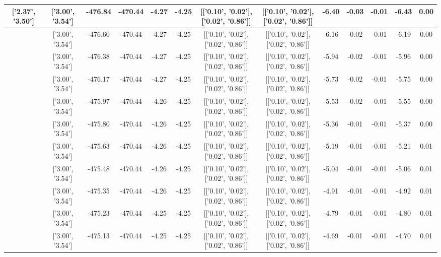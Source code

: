 \begin{table}[htbp]
\begin{adjustbox}{angle=90}
\begin{tabular}{|c|c|c|c|c|c|c|c|c|c|c|c|c|}
 ['2.37', '3.50'] & ['3.00', '3.54'] & -476.84 & -470.44 & -4.27 & -4.25 & [['0.10', '0.02'], ['0.02', '0.86']] & [['0.10', '0.02'], ['0.02', '0.86']] & -6.40 & -0.03 & -0.01 & -6.43 & 0.00\\ \hline
 ['2.41', '3.50'] & ['3.00', '3.54'] & -476.60 & -470.44 & -4.27 & -4.25 & [['0.10', '0.02'], ['0.02', '0.86']] & [['0.10', '0.02'], ['0.02', '0.86']] & -6.16 & -0.02 & -0.01 & -6.19 & 0.00\\ \hline
 ['2.45', '3.50'] & ['3.00', '3.54'] & -476.38 & -470.44 & -4.27 & -4.25 & [['0.10', '0.02'], ['0.02', '0.86']] & [['0.10', '0.02'], ['0.02', '0.86']] & -5.94 & -0.02 & -0.01 & -5.96 & 0.00\\ \hline
 ['2.48', '3.51'] & ['3.00', '3.54'] & -476.17 & -470.44 & -4.27 & -4.25 & [['0.10', '0.02'], ['0.02', '0.86']] & [['0.10', '0.02'], ['0.02', '0.86']] & -5.73 & -0.02 & -0.01 & -5.75 & 0.00\\ \hline
 ['2.52', '3.51'] & ['3.00', '3.54'] & -475.97 & -470.44 & -4.26 & -4.25 & [['0.10', '0.02'], ['0.02', '0.86']] & [['0.10', '0.02'], ['0.02', '0.86']] & -5.53 & -0.02 & -0.01 & -5.55 & 0.00\\ \hline
 ['2.56', '3.51'] & ['3.00', '3.54'] & -475.80 & -470.44 & -4.26 & -4.25 & [['0.10', '0.02'], ['0.02', '0.86']] & [['0.10', '0.02'], ['0.02', '0.86']] & -5.36 & -0.01 & -0.01 & -5.37 & 0.00\\ \hline
 ['2.60', '3.51'] & ['3.00', '3.54'] & -475.63 & -470.44 & -4.26 & -4.25 & [['0.10', '0.02'], ['0.02', '0.86']] & [['0.10', '0.02'], ['0.02', '0.86']] & -5.19 & -0.01 & -0.01 & -5.21 & 0.01\\ \hline
 ['2.64', '3.52'] & ['3.00', '3.54'] & -475.48 & -470.44 & -4.26 & -4.25 & [['0.10', '0.02'], ['0.02', '0.86']] & [['0.10', '0.02'], ['0.02', '0.86']] & -5.04 & -0.01 & -0.01 & -5.06 & 0.01\\ \hline
 ['2.67', '3.52'] & ['3.00', '3.54'] & -475.35 & -470.44 & -4.26 & -4.25 & [['0.10', '0.02'], ['0.02', '0.86']] & [['0.10', '0.02'], ['0.02', '0.86']] & -4.91 & -0.01 & -0.01 & -4.92 & 0.01\\ \hline
 ['2.71', '3.52'] & ['3.00', '3.54'] & -475.23 & -470.44 & -4.25 & -4.25 & [['0.10', '0.02'], ['0.02', '0.86']] & [['0.10', '0.02'], ['0.02', '0.86']] & -4.79 & -0.01 & -0.01 & -4.80 & 0.01\\ \hline
 ['2.75', '3.52'] & ['3.00', '3.54'] & -475.13 & -470.44 & -4.25 & -4.25 & [['0.10', '0.02'], ['0.02', '0.86']] & [['0.10', '0.02'], ['0.02', '0.86']] & -4.69 & -0.01 & -0.01 & -4.70 & 0.01\\ \hline

\end{tabular}
\end{adjustbox}
\end{table}
